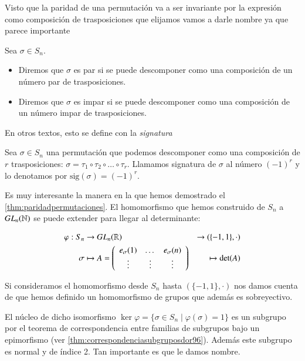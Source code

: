 Visto que la paridad de una permutación va a ser invariante por la expresión como composición de trasposiciones que elijamos vamos a darle nombre ya que parece importante

\begin{dfn}
	Sea $\sigma \in S_n$.
	\begin{itemize}
		\item Diremos que $\sigma$ es par si se puede descomponer como una composición de un número par de trasposiciones.
		
		\item Diremos que $\sigma$ es impar si se puede descomponer como una composición de un número impar de trasposiciones.
	\end{itemize}
\end{dfn}

En otros textos, esto se define con la \textit{signatura}

\begin{dfn}
	Sea $\sigma \in S_n$ una permutación que podemos descomponer como una composición de $r$ trasposiciones: $\sigma = \tau_1 \circ \tau_2 \circ \dots \circ \tau_r$. Llamamos signatura de $\sigma$ al número $(-1)^r$ y lo denotamos por $\text{sig}(\sigma) = (-1)^r$.
\end{dfn}

Es muy interesante la manera en la que hemos demostrado el \autoref{thm:paridadpermutaciones}. El homomorfismo que hemos construido de $S_n$ a $GL_n(\mathbb{N})$ se puede extender para llegar al determinante:

\begin{align*}
	\varphi : S_n &\to GL_n(\mathbb{R}) &\to (\{-1, 1\}, \cdot) \\
	\sigma &\mapsto A = \left(\begin{array}{ccc}
	e_\sigma(1) & \dots & e_\sigma(n) \\
	\vdots & \vdots & \vdots
	\end{array}\right) &\mapsto \det(A)
\end{align*}

Si consideramos el homomorfismo desde $S_n$ hasta $(\{-1, 1\}, \cdot)$ nos damos cuenta de que hemos definido un homomorfismo de grupos que además es sobreyectivo.

El núcleo de dicho isomorfismo $\ker \varphi = \{\sigma \in S_n \mid \varphi(\sigma) = 1\}$ es un subgrupo por el teorema de correspondencia entre familias de subgrupos bajo un epimorfismo (ver \autoref{thm:correspondenciasubgruposdor96}). Además este subgrupo es normal y de índice 2. Tan importante es que le damos nombre.

